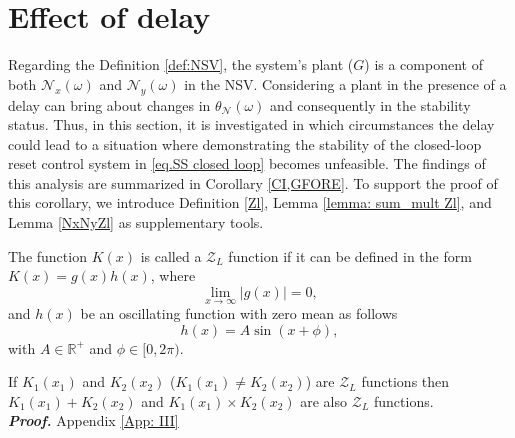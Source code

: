 \section{Effect of delay} \label{sec: delay}
Regarding the Definition \ref{def:NSV}, the system's plant ($G$) is a component of both $\mathcal{N}_x (\omega)$ and $\mathcal{N}_y (\omega)$ in the NSV. Considering a plant in the presence of a delay can bring about changes in $\theta_{\mathcal{N}} (\omega)$ and consequently in the stability status. Thus, in this section, it is investigated in which circumstances the delay could lead to a situation where demonstrating the stability of the closed-loop reset control system in \eqref{eq.SS closed loop} becomes unfeasible. The findings of this analysis are summarized in Corollary \ref{CI,GFORE}. To support the proof of this corollary, we introduce Definition \ref{Zl}, Lemma \ref{lemma: sum_mult Zl}, and Lemma \ref{NxNyZl} as supplementary tools.\\

\begin{definition}
    \label{Zl}
    The function $K(x)$ is called a $\mathcal{Z}_L$ function if it can be defined in the form $K(x)=g(x)h(x)$, where
    \begin{equation}
        \label{ZL function}
         \lim_{x\to\infty} |g(x)|=0,
    \end{equation}
    and $h(x)$ be an oscillating function with zero mean as follows
    \begin{equation}
        \label{ZL function h}
         h(x)=A\sin{(x+\phi)},
    \end{equation}
    with $A\in \mathbb{R}^{+}$ and $\phi \in [0,2\pi).$\\
\end{definition}

\begin{lemma}
    \label{lemma: sum_mult Zl}
    If $K_1(x_1)$ and $K_2(x_2)$ ($K_1(x_1)\neq K_2(x_2)$) are $\mathcal{Z}_L$ functions then $K_1(x_1)+K_2(x_2)$ and $K_1(x_1)\times K_2(x_2)$ are also $\mathcal{Z}_L$ functions.\\
    \textit{\textbf{Proof.}} Appendix \ref{App: III}\\
\end{lemma}

